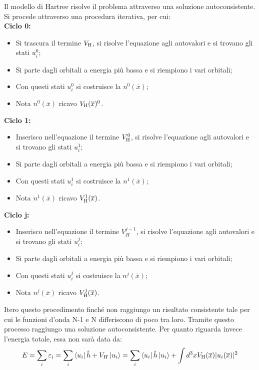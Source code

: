 Il modello di Hartree risolve il problema attraverso una soluzione autoconsistente. Si procede attraverso una procedura iterativa, per cui:
\\
\textbf{Ciclo 0:}
\begin{itemize}
    \item Si trascura il termine $V_{\text H}$, si risolve l'equazione agli autovalori e si trovano gli stati $u_i^0$;
    \item Si parte dagli orbitali a energia più bassa e si riempiono i vari orbitali;
    \item Con questi stati $u_i^0$ si costruisce la $n^0(\overline{x})$;
    \item Nota $n^0(\overline{x})$ ricavo $V_{\text H}(\overline x)^0$.
\end{itemize}
\textbf{Ciclo 1:}
\begin{itemize}
    \item Inserisco nell'equazione il termine $V_{\text H}^0$, si risolve l'equazione agli autovalori e si trovano gli stati $u_i^1$;
    \item Si parte dagli orbitali a energia più bassa e si riempiono i vari orbitali;
    \item Con questi stati $u_i^1$ si costruisce la $n^1(\overline{x})$;
    \item Nota $n^1(\overline{x})$ ricavo $V_{\text H}^1(\overline x)$.
\end{itemize}
\textbf{Ciclo j:}
\begin{itemize}
    \item Inserisco nell'equazione il termine $V_H^{j-1}$, si risolve l'equazione agli autovalori e si trovano gli stati $u_i^j$;
    \item Si parte dagli orbitali a energia più bassa e si riempiono i vari orbitali;
    \item Con questi stati $u_i^j$ si costruisce la $n^j(\overline{x})$;
    \item Nota $n^j(\overline{x})$ ricavo $V_{\text H}^j(\overline x)$.
\end{itemize}
Itero questo procedimento finché non raggiungo un risultato consistente tale per cui le funzioni d'onda N-1 e N differiscono di poco tra loro. Tramite questo processo raggiungo una soluzione autoconsistente.
Per quanto riguarda invece l'energia totale, essa non sarà data da:
\begin{equation*}
    E=\sum_i\varepsilon_i=\sum_i\bra{u_i}\hat h + V_H\ket{u_i}=\sum_i \bra{u_i}\hat h\ket{u_i}+\int d^3x V_{\text H}(\overline x)|u_i(\overline x)|^2
\end{equation*}
